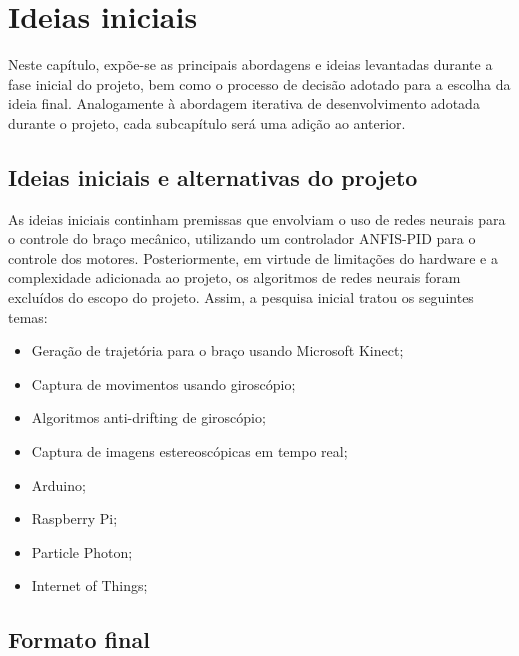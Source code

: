 
	\setlength{\absparsep}{18pt} %
	\chapter{Ideias iniciais}\label{cap-ideiasiniciais}
	
	Neste capítulo, expõe-se as principais abordagens e ideias levantadas durante a
	fase inicial do projeto, bem como o processo de decisão adotado para a escolha da ideia final. Analogamente à abordagem iterativa de desenvolvimento adotada durante o projeto, cada subcapítulo será uma adição ao anterior.\par
	
	\section{Ideias iniciais e alternativas do projeto}\label{subsec-iniciais}

As ideias iniciais continham premissas que envolviam o uso de redes neurais para o controle do braço mecânico, utilizando um controlador ANFIS-PID para o controle dos motores.
Posteriormente, em virtude de limitações do hardware e a complexidade adicionada ao projeto, os algoritmos de redes neurais foram excluídos do escopo do projeto. Assim, a pesquisa inicial tratou os seguintes temas:\par


\begin{itemize}[noitemsep]
	\item Geração de trajetória para o braço usando Microsoft Kinect;
	\item Captura de movimentos usando giroscópio;
	\item Algoritmos anti-drifting de giroscópio;
	\item Captura de imagens estereoscópicas em tempo real;
	\item Arduino;
	\item Raspberry Pi;
	\item Particle Photon;
	\item Internet of Things;
\end{itemize}

\section{Formato final}\label{subsec-formatofinal}

